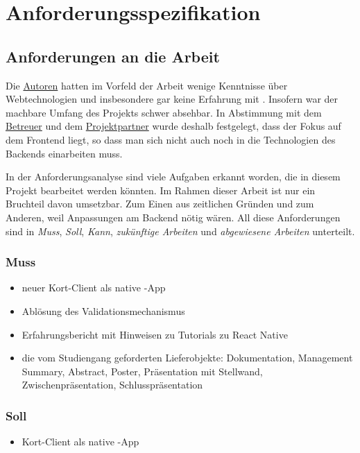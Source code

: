 \chapter{Anforderungsspezifikation}
\label{pd-anforderungsspezifikation}

\section{Anforderungen an die Arbeit} 
Die \hyperref[pm-team]{Autoren} hatten im Vorfeld der Arbeit wenige Kenntnisse über Webtechnologien und insbesondere gar keine Erfahrung mit .
Insofern war der machbare Umfang des Projekts schwer absehbar.
In Abstimmung mit dem \hyperref[pm-team]{Betreuer} und dem \hyperref[pm-team]{Projektpartner} wurde deshalb festgelegt, dass der Fokus auf dem Frontend liegt, so dass man sich nicht auch noch in die Technologien des Backends einarbeiten muss.

In der Anforderungsanalyse sind viele Aufgaben erkannt worden, die in diesem Projekt bearbeitet werden könnten. 
Im Rahmen dieser Arbeit ist nur ein Bruchteil davon umsetzbar.
Zum Einen aus zeitlichen Gründen und zum Anderen, weil Anpassungen am Backend nötig wären.
All diese Anforderungen sind in \emph{Muss}, \emph{Soll}, \emph{Kann}, \emph{zukünftige Arbeiten} und \emph{abgewiesene Arbeiten} unterteilt.

\subsection{Muss}
\begin{itemize}
	\item neuer Kort-Client als native -App
	\item Ablösung des Validationsmechanismus
	\item Erfahrungsbericht mit Hinweisen zu Tutorials zu React Native
	\item die vom Studiengang geforderten Lieferobjekte: Dokumentation, Management Summary, Abstract, Poster, Präsentation mit Stellwand, Zwischenpräsentation, Schlusspräsentation
\end{itemize}

\subsection{Soll}
\begin{itemize}
	\item Kort-Client als native -App
\end{itemize}

